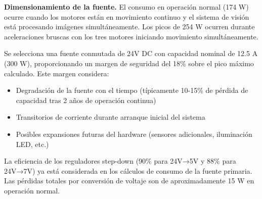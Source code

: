 \textbf{Dimensionamiento de la fuente.} El consumo en operación normal (174 W) ocurre cuando los motores están en movimiento continuo y el sistema de visión está procesando imágenes simultáneamente. Los picos de 254 W ocurren durante aceleraciones bruscas con los tres motores iniciando movimiento simultáneamente.

Se selecciona una fuente conmutada de 24V DC con capacidad nominal de 12.5 A (300 W), proporcionando un margen de seguridad del 18\% sobre el pico máximo calculado. Este margen considera:

\begin{itemize}[label=$\bullet$]
\item Degradación de la fuente con el tiempo (típicamente 10-15\% de pérdida de capacidad tras 2 años de operación continua)
\item Transitorios de corriente durante arranque inicial del sistema
\item Posibles expansiones futuras del hardware (sensores adicionales, iluminación LED, etc.)
\end{itemize}

La eficiencia de los reguladores step-down (90\% para 24V→5V y 88\% para 24V→7V) ya está considerada en los cálculos de consumo de la fuente primaria. Las pérdidas totales por conversión de voltaje son de aproximadamente 15 W en operación normal.
